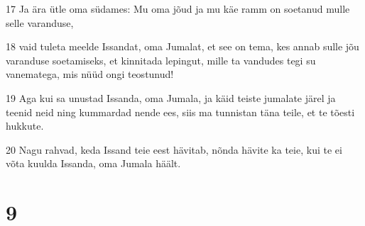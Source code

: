 \par 17 Ja ära ütle oma südames: Mu oma jõud ja mu käe ramm on soetanud mulle selle varanduse,
\par 18 vaid tuleta meelde Issandat, oma Jumalat, et see on tema, kes annab sulle jõu varanduse soetamiseks, et kinnitada lepingut, mille ta vandudes tegi su vanematega, mis nüüd ongi teostunud!
\par 19 Aga kui sa unustad Issanda, oma Jumala, ja käid teiste jumalate järel ja teenid neid ning kummardad nende ees, siis ma tunnistan täna teile, et te tõesti hukkute.
\par 20 Nagu rahvad, keda Issand teie eest hävitab, nõnda hävite ka teie, kui te ei võta kuulda Issanda, oma Jumala häält.

\chapter{9}


